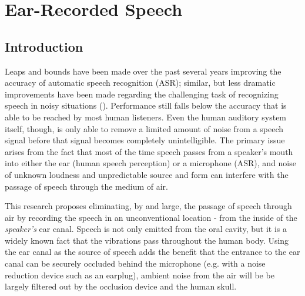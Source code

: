 \documentclass[dissertation,copyright]{uathesis}
\begin{document}




 





\chapter{Ear-Recorded Speech\label{chapter2}}


\section{Introduction}

Leaps and bounds have been made over the past several years improving the accuracy of automatic speech recognition (ASR); similar, but less dramatic improvements have been made regarding the challenging task of recognizing speech in noisy situations (\cite{zhang:17}).  Performance still falls below the accuracy that is able to be reached by most human listeners.  Even the human auditory system itself, though, is only able to remove a limited amount of noise from a speech signal before that signal becomes completely unintelligible.  The primary issue arises from the fact that most of the time speech passes from a speaker's mouth into either the ear (human speech perception) or a microphone (ASR), and noise of unknown loudness and unpredictable source and form can interfere with the passage of speech through the medium of air.  

This research proposes eliminating, by and large, the passage of speech through air by recording the speech in an unconventional location - from the inside of the \textit{speaker's} ear canal.  Speech is not only emitted from the oral cavity, but it is a widely known fact that the vibrations pass throughout the human body.  Using the ear canal as the source of speech adds the benefit that the entrance to the ear canal can be securely occluded behind the microphone (e.g. with a noise reduction device such as an earplug), ambient noise from the air will be be largely filtered out by the occlusion device and the human skull.
\end{document}
